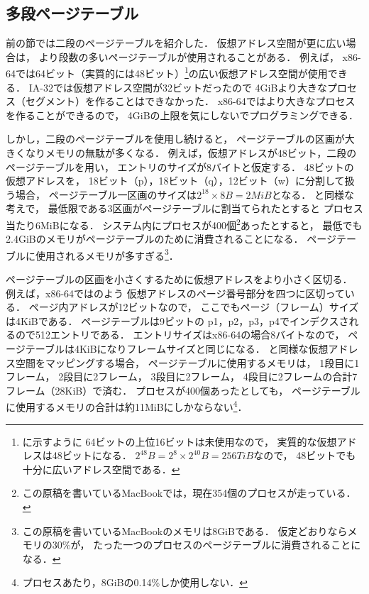 \subsection{多段ページテーブル}
前の節では二段のページテーブルを紹介した．
仮想アドレス空間が更に広い場合は，
より段数の多いページテーブルが使用されることがある．
例えば，
x86-64では64ビット（実質的には48ビット）\footnote{
に示すように
64ビットの上位16ビットは未使用なので，
実質的な仮想アドレスは48ビットになる．
$2^{48}B = 2^8 \times 2^{40}B = 256TiB$なので，
48ビットでも十分に広いアドレス空間である．
}の広い仮想アドレス空間が使用できる．
IA-32では仮想アドレス空間が32ビットだったので
4GiBより大きなプロセス（セグメント）を作ることはできなかった．
x86-64ではより大きなプロセスを作ることができるので，
4GiBの上限を気にしないでプログラミングできる．

しかし，二段のページテーブルを使用し続けると，
ページテーブルの区画が大きくなりメモリの無駄が多くなる．
例えば，仮想アドレスが48ビット，二段のページテーブルを用い，
エントリのサイズが8バイトと仮定する．
48ビットの仮想アドレスを，
18ビット（p），18ビット（q），12ビット（w）に分割して扱う場合，
ページテーブル一区画のサイズは$2^{18} \times 8B = 2MiB$となる．
と同様な考えで，
最低限である3区画がページテーブルに割当てられたとすると
プロセス当たり6MiBになる．
システム内にプロセスが400個\footnote{
この原稿を書いているMacBookでは，現在354個のプロセスが走っている．
}あったとすると，
最低でも2.4GiBのメモリがページテーブルのために消費されることになる．
ページテーブルに使用されるメモリが多すぎる\footnote{
この原稿を書いているMacBookのメモリは8GiBである．
仮定どおりならメモリの30\%が，
たった一つのプロセスのページテーブルに消費されることになる．
}．

ページテーブルの区画を小さくするために仮想アドレスをより小さく区切る．
例えば，x86-64ではのよう
仮想アドレスのページ番号部分を四つに区切っている．
ページ内アドレスが12ビットなので，
ここでもページ（フレーム）サイズは4KiBである．
ページテーブルは9ビットの
p1，p2，p3，p4でインデクスされるので512エントリである．
エントリサイズはx86-64の場合8バイトなので，
ページテーブルは4KiBになりフレームサイズと同じになる．
と同様な仮想アドレス空間をマッピングする場合，
ページテーブルに使用するメモリは，
1段目に1フレーム，
2段目に2フレーム，
3段目に2フレーム，
4段目に2フレームの合計7フレーム（28KiB）で済む．
プロセスが400個あったとしても，
ページテーブルに使用するメモリの合計は約11MiBにしかならない\footnote{
プロセスあたり，8GiBの0.14\%しか使用しない．}．

